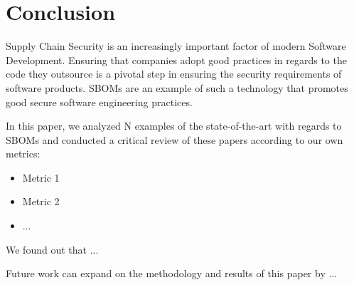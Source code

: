 \section{Conclusion}

Supply Chain Security is an increasingly important factor of modern Software Development. Ensuring that companies adopt good practices in regards to the code they outsource is a pivotal step in ensuring the security requirements of software products. SBOMs \cite{article:concept:sbom-2} are an example of such a technology that promotes good secure software engineering practices.

\noindent In this paper, we analyzed N examples of the state-of-the-art with regards to SBOMs and conducted a critical review of these papers according to our own metrics:
\begin{itemize}
    \item Metric 1
    \item Metric 2
    \item ...
\end{itemize}

\noindent We found out that ...

\noindent Future work can expand on the methodology and results of this paper by ...